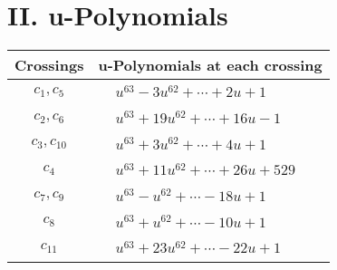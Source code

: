 \documentclass[1p]{elsarticle_modified}
\theoremstyle{definition}
\begin{document}
\newpage\renewcommand{\arraystretch}{1}
\centering \section*{ II. u-Polynomials}
\begin{tabular}{m{50pt}|m{274pt}}
Crossings & \hspace{64pt}u-Polynomials at each crossing \\
\hline $$\begin{aligned}c_{1},c_{5}\end{aligned}$$&$\begin{aligned}
&u^{63}-3 u^{62}+\cdots+2 u+1
\end{aligned}$\\
\hline $$\begin{aligned}c_{2},c_{6}\end{aligned}$$&$\begin{aligned}
&u^{63}+19 u^{62}+\cdots+16 u-1
\end{aligned}$\\
\hline $$\begin{aligned}c_{3},c_{10}\end{aligned}$$&$\begin{aligned}
&u^{63}+3 u^{62}+\cdots+4 u+1
\end{aligned}$\\
\hline $$\begin{aligned}c_{4}\end{aligned}$$&$\begin{aligned}
&u^{63}+11 u^{62}+\cdots+26 u+529
\end{aligned}$\\
\hline $$\begin{aligned}c_{7},c_{9}\end{aligned}$$&$\begin{aligned}
&u^{63}- u^{62}+\cdots-18 u+1
\end{aligned}$\\
\hline $$\begin{aligned}c_{8}\end{aligned}$$&$\begin{aligned}
&u^{63}+u^{62}+\cdots-10 u+1
\end{aligned}$\\
\hline $$\begin{aligned}c_{11}\end{aligned}$$&$\begin{aligned}
&u^{63}+23 u^{62}+\cdots-22 u+1
\end{aligned}$\\
\hline
\end{tabular}\newpage\renewcommand{\arraystretch}{1}
\end{document}
